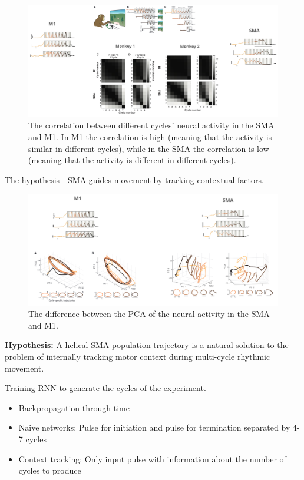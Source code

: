 \documentclass[11pt]{book} %
\begin{document}
\begin{figure}[h]
    \centering
    \includegraphics[width=\textwidth]{./Figs/monkeyb2.jpeg}
    \caption{The correlation between different cycles' neural activity in the SMA and M1. In M1 the correlation is high 
    (meaning that the activity is similar in different cycles), while in the SMA the correlation is low (meaning that the activity is different in different cycles).}
    \label{fig:entanglement_untangling}
\end{figure}

The hypothesis - SMA guides movement by tracking contextual factors. 

\begin{figure}[h]
    \centering
    \includegraphics[width=\textwidth]{./Figs/monkeyb3.jpeg}
    \caption{The difference between the PCA of the neural activity in the SMA and M1.}
    \label{fig:entanglement_untangling}
\end{figure}

\textbf{Hypothesis:} A helical SMA population trajectory is a natural solution to the problem of internally tracking motor context during multi-cycle rhythmic movement.

Training RNN to generate the cycles of the experiment. \\
\begin{itemize}
    \item Backpropagation through time
    \item Naive networks: Pulse for initiation and pulse for termination separated by 4-7 cycles
    \item Context tracking: Only input pulse with information about the number of cycles to produce
\end{itemize}
  
\end{document}
